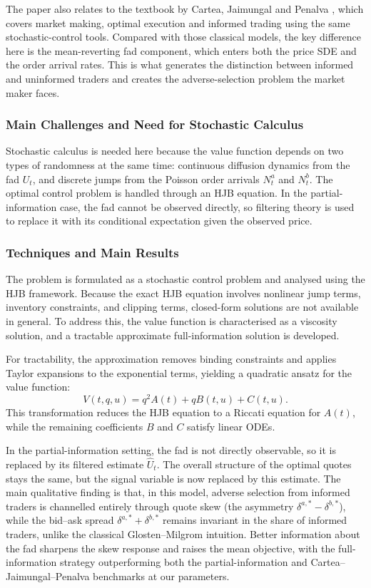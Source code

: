 \documentclass[11pt,a4paper]{article}
\theoremstyle{plain}
\theoremstyle{definition}
\begin{document}
The paper also relates to the textbook by Cartea, Jaimungal and Penalva
\cite{cartea2015algorithmic}, which covers market making, optimal execution
and informed trading using the same stochastic-control tools. Compared with
those classical models, the key difference here is the mean-reverting fad
component, which enters both the price SDE and the order arrival rates.
This is what generates the distinction between informed and uninformed
traders and creates the adverse-selection problem the market maker faces.

\subsubsection{Main Challenges and Need for Stochastic Calculus}

Stochastic calculus is needed here because the value function depends on
two types of randomness at the same time: continuous diffusion dynamics
from the fad $U_t$, and discrete jumps from the Poisson order arrivals
$N^a_t$ and $N^b_t$. The optimal control problem is handled through an
HJB equation. In the partial-information case, the fad cannot be observed
directly, so filtering theory is used to replace it with its conditional
expectation given the observed price.

\subsubsection{Techniques and Main Results}

The problem is formulated as a stochastic control problem and analysed
using the HJB framework. Because the exact HJB equation involves nonlinear
jump terms, inventory constraints, and clipping terms, closed-form solutions
are not available in general. To address this, the value function is
characterised as a viscosity solution, and a tractable approximate
full-information solution is developed.

For tractability, the approximation removes binding constraints and applies
Taylor expansions to the exponential terms, yielding a quadratic
ansatz for the value function:
\[
  V(t,q,u) = q^2 A(t) + q B(t,u) + C(t,u).
\]
This transformation reduces the HJB equation to a Riccati equation for
$A(t)$, while the remaining coefficients $B$ and $C$ satisfy linear ODEs.

In the partial-information setting, the fad is not directly observable, so
it is replaced by its filtered estimate $\hat{U}_t$. The overall structure
of the optimal quotes stays the same, but the signal variable is now
replaced by this estimate. The main qualitative finding is that, in this
model, adverse selection from informed traders is channelled entirely
through quote skew (the asymmetry $\delta^{a,*}-\delta^{b,*}$),
while the bid--ask spread $\delta^{a,*}+\delta^{b,*}$ remains invariant in
the share of informed traders, unlike the classical
Glosten--Milgrom intuition. Better information about the fad sharpens the
skew response and raises the mean objective, with the full-information
strategy outperforming both the partial-information and
Cartea--Jaimungal--Penalva benchmarks at our parameters.
\end{document}
